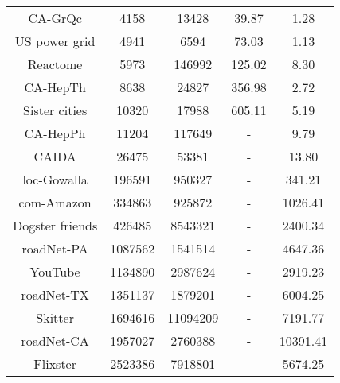 \documentclass[sigconf]{acmart}
\begin{document}
\begin{table}
\begin{tabular}{ccccc}
        CA-GrQc                & 4158                 & 13428                & 39.87                              & 1.28            \\
        US power grid          & 4941                 & 6594                 & 73.03                              & 1.13            \\
        Reactome               & 5973                 & 146992               & 125.02                             & 8.30            \\
        CA-HepTh               & 8638                 & 24827                & 356.98                             & 2.72            \\
        Sister cities          & 10320                & 17988                & 605.11                             & 5.19            \\
        CA-HepPh               & 11204                & 117649               & -                                  & 9.79            \\
        CAIDA                  & 26475                & 53381                & -                                  & 13.80           \\
        loc-Gowalla            & 196591               & 950327               & -                                  & 341.21          \\
        com-Amazon             & 334863               & 925872               & -                                  & 1026.41         \\
        Dogster friends        & 426485               & 8543321              & -                                  & 2400.34         \\
        roadNet-PA             & 1087562              & 1541514              & -                                  & 4647.36         \\
        YouTube                & 1134890              & 2987624              & -                                  & 2919.23         \\
        roadNet-TX             & 1351137              & 1879201              & -                                  & 6004.25         \\
        Skitter                & 1694616              & 11094209             & -                                  & 7191.77         \\
        roadNet-CA             & 1957027              & 2760388              & -                                  & 10391.41        \\
        Flixster               & 2523386              & 7918801              & -                                  & 5674.25         \\
        \bottomrule
    \end{tabular}
\end{table}
\end{document}
